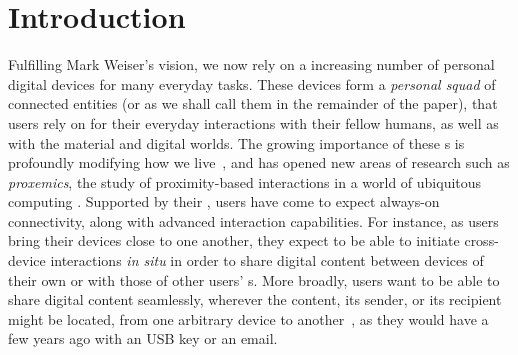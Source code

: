 
\section{Introduction}


Fulfilling Mark Weiser's vision, we now rely on a increasing number of personal digital devices for many everyday tasks. These devices form a \textit{personal squad} of connected entities (or \emph{\squad} as we shall call them in the remainder of the
paper), that users rely on for their everyday interactions with their fellow humans, as well as with the material and digital worlds.
The growing importance of these \squad{}s is profoundly modifying how we live~\cite{Dearman:2008, Oh:2017, Sohn:2008,Harper08}, and has opened new areas of research such as \textit{proxemics}, the study of proximity-based interactions in a world of ubiquitous computing
\cite{Marquardt:2011}.
Supported by their \squad, users
have come to expect always-on connectivity, along with advanced interaction
capabilities. For instance, as users bring
their devices close to one another, they expect to be able to initiate cross-device
interactions \textit{in situ} in order to share digital content
\cite{Oh:2017} between devices of their own \squad or with those of other users' \squad{}s. More broadly, users want to be able to share digital content seamlessly,
wherever the content, its sender, or its recipient might be located, from one
arbitrary device to another~\cite{Dearman:2008}, as they
would have a few years ago with an USB key or an email. 


